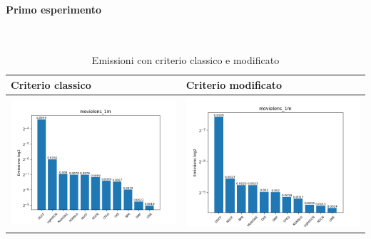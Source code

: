 \paragraph{Primo esperimento} \textcolor{white}{.} \\
\begin{table}[H]
    \centering
    \footnotesize
    \setlength\tabcolsep{0pt}
    \begin{tabularx}{\textwidth}{|X|X|}
        \hline
        \textbf{Criterio classico} & \textbf{Criterio modificato} \\
        \hline
        \includegraphics[width=\linewidth, trim=0 0 0 0]{images/emissions_movielens_1m_earlyClassic.png} &
        \includegraphics[width=\linewidth, trim=0 0 0 0]{images/emissions_movielens_1m_earlyModified.png} \\
        \hline
    \end{tabularx}
    \caption{Emissioni con criterio classico e modificato}
    \label{tab:emissions_info}
\end{table}

